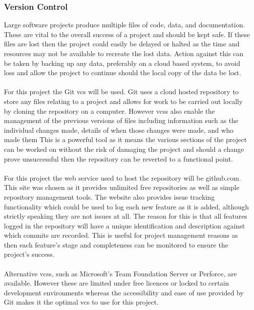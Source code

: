		\subsubsection{Version Control}\label{sec:methodology_version_control}
			Large software projects produce multiple files of code, data, and documentation. These are vital to the overall success of a project and should be kept safe. If these files are lost then the project could easily be delayed or halted as the time and resources may not be available to recreate the lost data. Action against this can be taken by backing up any data, preferably on a cloud based system, to avoid loss and allow the project to continue should the local copy of the data be lost.
			\\\\
			For this project the Git \gls{vcs} will be used. Git uses a cloud hosted repository to store any files relating to a project and allows for work to be carried out locally by cloning the repository on a computer. However \glspl{vcs} also enable the management of the previous versions of files including information such as the individual changes made, details of when those changes were made, and who made them This is a powerful tool as it means the various sections of the project can be worked on without the risk of damaging the project and should a change prove unsuccessful then the repository can be reverted to a functional point.
			\\\\
			For this project the web service used to host the repository will be github.com. This site was chosen as it provides unlimited free repositories as well as simple repository management tools. The website also provides issue tracking functionality which could be used to log each new feature as it is added, although strictly speaking they are not issues at all. The reason for this is that all features logged in the repository will have a unique identification and description against which commits are recorded. This is useful for project management reasons as then each feature’s stage and completeness can be monitored to ensure the project’s success.
			\\\\
			Alternative \glspl{vcs}, such as Microsoft’s Team Foundation Server or Perforce, are available. However these are limited under free licences or locked to certain development environments whereas the accessibility and ease of use provided by Git makes it the optimal \gls{vcs} to use for this project.
